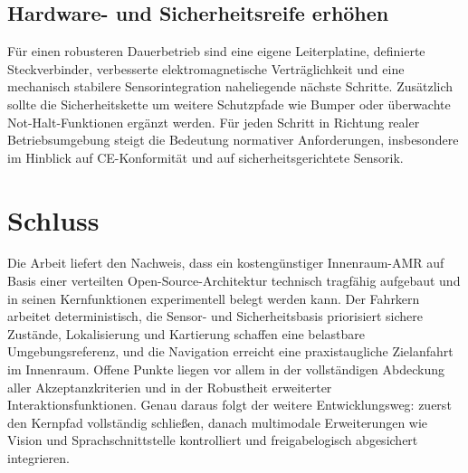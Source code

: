 \subsection{Hardware- und Sicherheitsreife erhöhen}

Für einen robusteren Dauerbetrieb sind eine eigene Leiterplatine, definierte Steckverbinder, verbesserte elektromagnetische Verträglichkeit und eine mechanisch stabilere Sensorintegration naheliegende nächste Schritte. Zusätzlich sollte die Sicherheitskette um weitere Schutzpfade wie Bumper oder überwachte Not-Halt-Funktionen ergänzt werden. Für jeden Schritt in Richtung realer Betriebsumgebung steigt die Bedeutung normativer Anforderungen, insbesondere im Hinblick auf CE-Konformität und auf sicherheitsgerichtete Sensorik.

\section{Schluss}

Die Arbeit liefert den Nachweis, dass ein kostengünstiger Innenraum-AMR auf Basis einer verteilten Open-Source-Architektur technisch tragfähig aufgebaut und in seinen Kernfunktionen experimentell belegt werden kann. Der Fahrkern arbeitet deterministisch, die Sensor- und Sicherheitsbasis priorisiert sichere Zustände, Lokalisierung und Kartierung schaffen eine belastbare Umgebungsreferenz, und die Navigation erreicht eine praxistaugliche Zielanfahrt im Innenraum. Offene Punkte liegen vor allem in der vollständigen Abdeckung aller Akzeptanzkriterien und in der Robustheit erweiterter Interaktionsfunktionen. Genau daraus folgt der weitere Entwicklungsweg: zuerst den Kernpfad vollständig schließen, danach multimodale Erweiterungen wie Vision und Sprachschnittstelle kontrolliert und freigabelogisch abgesichert integrieren.
